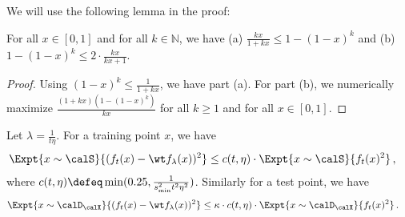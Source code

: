We will use the following lemma in the proof: 
\begin{lemma} \label{lem:ineq_soln}
    For all $x \in [0,1]$ and for all $ k \in \mathbb{N}$, 
    we have (a) $ \frac{kx}{1+kx} \le 1- (1-x)^k$ 
    and (b) $ 1- (1-x)^k \le 2 \cdot \frac{kx}{kx+1} $.
\end{lemma}
\begin{proof}
    Using $ (1-x)^k \le \frac{1}{1+kx}$, we have part (a). 
    For part (b), we numerically maximize 
    $\frac{ (1+kx ) (1 - (1-x)^k) }{kx}$ 
    for all $k\ge 1$ and for all $x \in [0, 1]$.  
\end{proof}

% 

\begin{prop} \label{prop:formal_early_stop}
Let $\lambda = \frac{1}{t\eta}$. 
For a training point $x$, we have 
\begin{align*}
    \Expt{x \sim \calS}{(f_t(x) - \wt f_\lambda(x))^2} &\le c(t,\eta) \cdot \Expt{x \sim \calS}{f_t(x)^2} \,, %
\end{align*}
where $c(t, \eta) \defeq \min( 0.25, \frac{1}{s_\text{min}^2 t^2 \eta^2})$. 
Similarly for a test point, we have 
\begin{align*}
    \Expt{x \sim \calD_\calX}{(f_t(x) - \wt f_\lambda(x))^2} &\le \kappa \cdot c(t,\eta) \cdot \Expt{x \sim \calD_\calX}{f_t(x)^2} \,. %
\end{align*}
\end{prop} 

